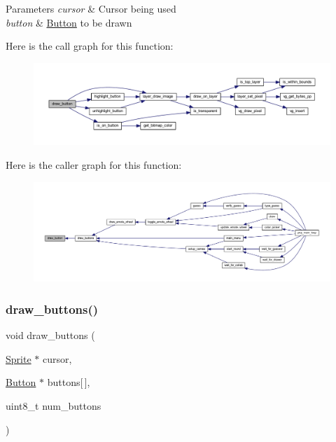 \begin{DoxyParams}{Parameters}
{\em cursor} & Cursor being used \\
\hline
{\em button} & \mbox{\hyperlink{struct_button}{Button}} to be drawn \\
\hline
\end{DoxyParams}
Here is the call graph for this function\+:\nopagebreak
\begin{figure}[H]
\begin{center}
\leavevmode
\includegraphics[width=350pt]{group__sprite_ga39cf20a4f80d3e42f7ecc3dab4bd7b65_cgraph}
\end{center}
\end{figure}
Here is the caller graph for this function\+:\nopagebreak
\begin{figure}[H]
\begin{center}
\leavevmode
\includegraphics[width=350pt]{group__sprite_ga39cf20a4f80d3e42f7ecc3dab4bd7b65_icgraph}
\end{center}
\end{figure}
\mbox{\label{group__sprite_ga73cc8ddf6dbcb83935fabd2443251edd}} 
\subsubsection{\texorpdfstring{draw\+\_\+buttons()}{draw\_buttons()}}
{\footnotesize\ttfamily void draw\+\_\+buttons (\begin{DoxyParamCaption}\item[{\mbox{\hyperlink{struct_sprite}{Sprite}} $\ast$}]{cursor,  }\item[{\mbox{\hyperlink{struct_button}{Button}} $\ast$}]{buttons\mbox{[}$\,$\mbox{]},  }\item[{uint8\+\_\+t}]{num\+\_\+buttons }\end{DoxyParamCaption})}



